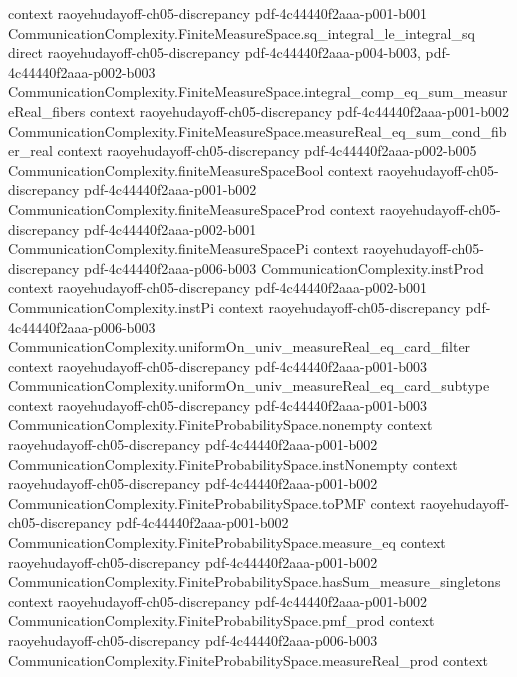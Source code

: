 \begin{lemma}
  {context}
  {raoyehudayoff-ch05-discrepancy}
  {pdf-4c44440f2aaa-p001-b001}
\proofstep
  {CommunicationComplexity.FiniteMeasureSpace.sq_integral_le_integral_sq}
  {direct}
  {raoyehudayoff-ch05-discrepancy}
  {pdf-4c44440f2aaa-p004-b003,
    pdf-4c44440f2aaa-p002-b003}
\proofstep
  {CommunicationComplexity.FiniteMeasureSpace.integral_comp_eq_sum_measureReal_fibers}
  {context}
  {raoyehudayoff-ch05-discrepancy}
  {pdf-4c44440f2aaa-p001-b002}
\proofstep
  {CommunicationComplexity.FiniteMeasureSpace.measureReal_eq_sum_cond_fiber_real}
  {context}
  {raoyehudayoff-ch05-discrepancy}
  {pdf-4c44440f2aaa-p002-b005}
\proofstep
  {CommunicationComplexity.finiteMeasureSpaceBool}
  {context}
  {raoyehudayoff-ch05-discrepancy}
  {pdf-4c44440f2aaa-p001-b002}
\proofstep
  {CommunicationComplexity.finiteMeasureSpaceProd}
  {context}
  {raoyehudayoff-ch05-discrepancy}
  {pdf-4c44440f2aaa-p002-b001}
\proofstep
  {CommunicationComplexity.finiteMeasureSpacePi}
  {context}
  {raoyehudayoff-ch05-discrepancy}
  {pdf-4c44440f2aaa-p006-b003}
\proofstep
  {CommunicationComplexity.instProd}
  {context}
  {raoyehudayoff-ch05-discrepancy}
  {pdf-4c44440f2aaa-p002-b001}
\proofstep
  {CommunicationComplexity.instPi}
  {context}
  {raoyehudayoff-ch05-discrepancy}
  {pdf-4c44440f2aaa-p006-b003}
\proofstep
  {CommunicationComplexity.uniformOn_univ_measureReal_eq_card_filter}
  {context}
  {raoyehudayoff-ch05-discrepancy}
  {pdf-4c44440f2aaa-p001-b003}
\proofstep
  {CommunicationComplexity.uniformOn_univ_measureReal_eq_card_subtype}
  {context}
  {raoyehudayoff-ch05-discrepancy}
  {pdf-4c44440f2aaa-p001-b003}
\proofstep
  {CommunicationComplexity.FiniteProbabilitySpace.nonempty}
  {context}
  {raoyehudayoff-ch05-discrepancy}
  {pdf-4c44440f2aaa-p001-b002}
\proofstep
  {CommunicationComplexity.FiniteProbabilitySpace.instNonempty}
  {context}
  {raoyehudayoff-ch05-discrepancy}
  {pdf-4c44440f2aaa-p001-b002}
\proofstep
  {CommunicationComplexity.FiniteProbabilitySpace.toPMF}
  {context}
  {raoyehudayoff-ch05-discrepancy}
  {pdf-4c44440f2aaa-p001-b002}
\proofstep
  {CommunicationComplexity.FiniteProbabilitySpace.measure_eq}
  {context}
  {raoyehudayoff-ch05-discrepancy}
  {pdf-4c44440f2aaa-p001-b002}
\proofstep
  {CommunicationComplexity.FiniteProbabilitySpace.hasSum_measure_singletons}
  {context}
  {raoyehudayoff-ch05-discrepancy}
  {pdf-4c44440f2aaa-p001-b002}
\proofstep
  {CommunicationComplexity.FiniteProbabilitySpace.pmf_prod}
  {context}
  {raoyehudayoff-ch05-discrepancy}
  {pdf-4c44440f2aaa-p006-b003}
\proofstep
  {CommunicationComplexity.FiniteProbabilitySpace.measureReal_prod}
  {context}

\end{lemma}
